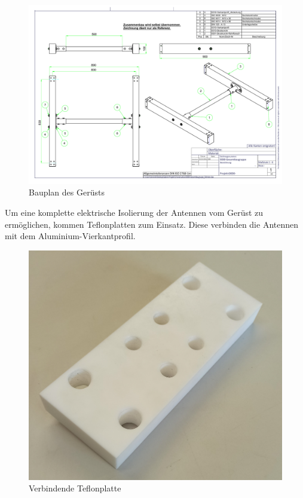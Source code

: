 \begin{figure}[h!]
	\centering
	\includegraphics[keepaspectratio=true,scale=0.5]{../ref/0000-Gesamtbaugruppe_Rahmen.pdf}
	\caption{Bauplan des Gerüsts}
	\label{fig:Gerüst}
\end{figure}

Um eine komplette elektrische Isolierung der Antennen vom Gerüst zu ermöglichen, kommen Teflonplatten zum Einsatz. Diese verbinden die Antennen mit dem Aluminium-Vierkantprofil.

\begin{figure}[H]
	\includegraphics[width=\linewidth]{../ref/Teflon-Platte.jpg}
	\caption{Verbindende Teflonplatte}
	\label{fig:Teflonplatte}
\end{figure}

